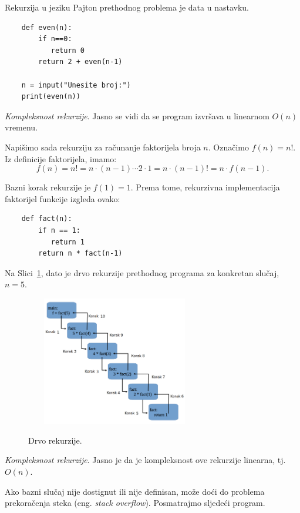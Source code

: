Rekurzija u jeziku Pajton  prethodnog    problema je data u nastavku.

\begin{verbatim}
	def even(n):
		if n==0:
		   return 0
		return 2 + even(n-1) 
		
	n = input("Unesite broj:")
	print(even(n)) 

\end{verbatim}

\textit{Kompleksnost rekurzije}. Jasno se vidi da se program izvršava u linearnom $O(n)$ vremenu. \\ \vspace{0.2cm}

Napišimo sada rekurziju za računanje faktorijela broja $n$. Označimo $f(n) = n!$. Iz definicije faktorijela, imamo: 
$$f(n) = n! = n \cdot (n-1) \cdots 2 \cdot 1  = n \cdot (n-1)! = n \cdot f(n-1).$$

Bazni korak rekurzije je $f(1)= 1$. Prema tome, rekurzivna implementacija faktorijel funkcije izgleda ovako:
\begin{verbatim}
	def fact(n):
		if n == 1:
		   return 1
		return n * fact(n-1)
\end{verbatim}

Na Slici~\ref{fig:rec_tree}, dato je drvo rekurzije prethodnog programa za konkretan slučaj, $n=5$.

\begin{figure}[H]
	\centering
	\includegraphics[width=220pt,height=160pt]{slike/factorial_recursion_tree.png} 
	\label{fig:rec_tree}
	\caption{Drvo rekurzije.}
\end{figure}

 


\textit{Kompleksnost rekurzije}. Jasno je da je kompleksnost ove rekurzije linearna, tj. $O(n)$. \\ \vspace{0.2cm}


Ako bazni slučaj nije dostignut ili nije definisan, može doći do problema  prekoračenja steka (eng. \textit{stack overflow}). Posmatrajmo sljedeći program.

